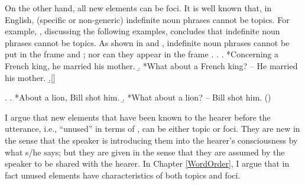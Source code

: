 On the other hand,
all new elements can be foci.
It is well known that, in English, (specific or non-generic) indefinite noun phrases cannot be topics.
For example, , discussing the following examples,
concludes that indefinite noun phrases cannot be topics.
As shown in \Next[a] and \NNext[a],
indefinite noun phrases cannot be put in the frame  and ;
nor can they appear in the frame .
%
\ex. 
  \a. *Concerning a French king, he married his mother.
  \b. *What about a French king? -- He married his mother.
  \b.[] \hfill{\cite[p.~54]{gundel74}}

\ex.
  \a. *About a lion, Bill shot him.
  \b. *What about a lion? -- Bill shot him.
     \hfill{()}


I argue that new elements that have been known to the hearer before the utterance, i.e., ``unused'' in terms of , can be either topic or foci.
They are new in the sense that the speaker is introducing them into the hearer's consciousness by what s/he says;
but they are given in the sense that they are assumed by the speaker to be shared with the hearer.
In Chapter \ref{WordOrder},
I argue that in fact unused elements have characteristics of both topics and foci.
%




